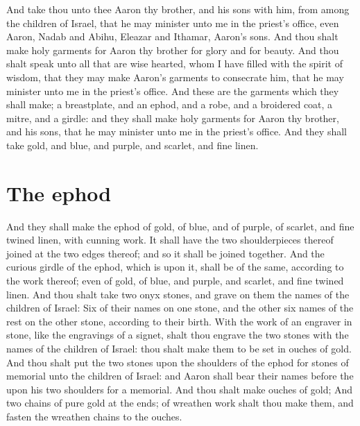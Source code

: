 \begin{biblechapter} %
\verse And take thou unto thee Aaron thy brother, and his sons with him, from among the children of Israel, that he may minister unto me in the priest's office, even Aaron, Nadab and Abihu, Eleazar and Ithamar, Aaron's sons.
\verse And thou shalt make holy garments for Aaron thy brother for glory and for beauty.
\verse And thou shalt speak unto all that are wise hearted, whom I have filled with the spirit of wisdom, that they may make Aaron's garments to consecrate him, that he may minister unto me in the priest's office.
\verse And these are the garments which they shall make; a breastplate, and an ephod, and a robe, and a broidered coat, a mitre, and a girdle: and they shall make holy garments for Aaron thy brother, and his sons, that he may minister unto me in the priest's office.
\verse And they shall take gold, and blue, and purple, and scarlet, and fine linen.
\section*{The ephod}
\verse And they shall make the ephod of gold, of blue, and of purple, of scarlet, and fine twined linen, with cunning work.
\verse It shall have the two shoulderpieces thereof joined at the two edges thereof; and so it shall be joined together.
\verse And the curious girdle of the ephod, which is upon it, shall be of the same, according to the work thereof; even of gold, of blue, and purple, and scarlet, and fine twined linen.
\verse And thou shalt take two onyx stones, and grave on them the names of the children of Israel:
\verse Six of their names on one stone, and the other six names of the rest on the other stone, according to their birth.
\verse With the work of an engraver in stone, like the engravings of a signet, shalt thou engrave the two stones with the names of the children of Israel: thou shalt make them to be set in ouches of gold.
\verse And thou shalt put the two stones upon the shoulders of the ephod for stones of memorial unto the children of Israel: and Aaron shall bear their names before the \LORD upon his two shoulders for a memorial.
\verse And thou shalt make ouches of gold;
\verse And two chains of pure gold at the ends; of wreathen work shalt thou make them, and fasten the wreathen chains to the ouches.

\end{biblechapter}
